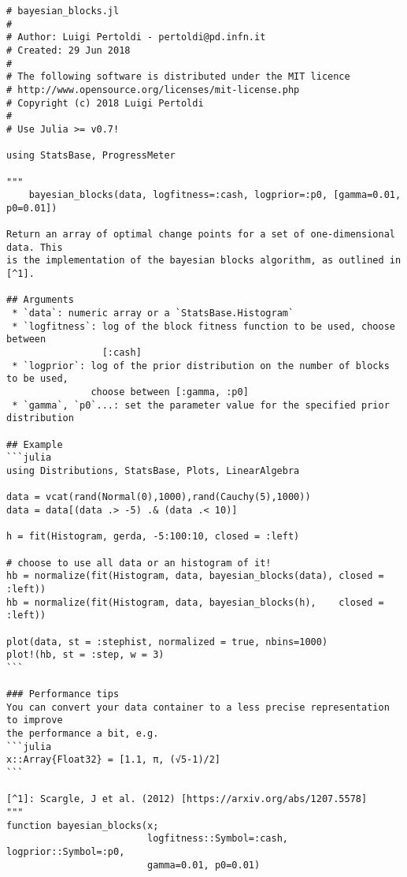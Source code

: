 \begin{lstlisting}
# bayesian_blocks.jl
#
# Author: Luigi Pertoldi - pertoldi@pd.infn.it
# Created: 29 Jun 2018
#
# The following software is distributed under the MIT licence
# http://www.opensource.org/licenses/mit-license.php
# Copyright (c) 2018 Luigi Pertoldi
#
# Use Julia >= v0.7!

using StatsBase, ProgressMeter

"""
    bayesian_blocks(data, logfitness=:cash, logprior=:p0, [gamma=0.01, p0=0.01])

Return an array of optimal change points for a set of one-dimensional data. This
is the implementation of the bayesian blocks algorithm, as outlined in [^1].

## Arguments
 * `data`: numeric array or a `StatsBase.Histogram`
 * `logfitness`: log of the block fitness function to be used, choose between
                 [:cash]
 * `logprior`: log of the prior distribution on the number of blocks to be used,
               choose between [:gamma, :p0]
 * `gamma`, `p0`...: set the parameter value for the specified prior distribution

## Example
```julia
using Distributions, StatsBase, Plots, LinearAlgebra

data = vcat(rand(Normal(0),1000),rand(Cauchy(5),1000))
data = data[(data .> -5) .& (data .< 10)]

h = fit(Histogram, gerda, -5:100:10, closed = :left)

# choose to use all data or an histogram of it!
hb = normalize(fit(Histogram, data, bayesian_blocks(data), closed = :left))
hb = normalize(fit(Histogram, data, bayesian_blocks(h),    closed = :left))

plot(data, st = :stephist, normalized = true, nbins=1000)
plot!(hb, st = :step, w = 3)
```

### Performance tips
You can convert your data container to a less precise representation to improve
the performance a bit, e.g.
```julia
x::Array{Float32} = [1.1, π, (√5-1)/2]
```

[^1]: Scargle, J et al. (2012) [https://arxiv.org/abs/1207.5578]
"""
function bayesian_blocks(x;
                         logfitness::Symbol=:cash, logprior::Symbol=:p0,
                         gamma=0.01, p0=0.01)


\end{lstlisting}
